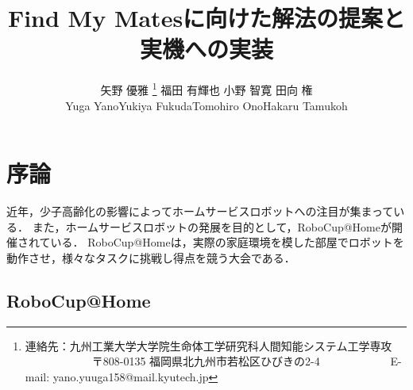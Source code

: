 \documentclass[a4j]{jarticle}
\begin{document}
\title{Find My Matesに向けた解法の提案と実機への実装}



\author{矢野 優雅%
	\thanks{連絡先：九州工業大学大学院生命体工学研究科人間知能システム工学専攻 \newline%
		　　　　　　〒808-0135 福岡県北九州市若松区ひびきの2-4 \newline%
		　　　　　　E-mail: yano.yuuga158@mail.kyutech.jp}\quad%
	福田 有輝也
	小野 智寛
	田向 権\\
	Yuga Yano\quad \quad Yukiya Fukuda\quad \quad Tomohiro Ono\quad \quad Hakaru Tamukoh}



\maketitle
\thispagestyle{empty}


\section{序論}
近年，少子高齢化の影響によってホームサービスロボットへの注目が集まっている．
また，ホームサービスロボットの発展を目的として，RoboCup@Homeが開催されている．
RoboCup@Homeは，実際の家庭環境を模した部屋でロボットを動作させ，様々なタスクに挑戦し得点を競う大会である．

\subsection{RoboCup@Home}
\end{document}
